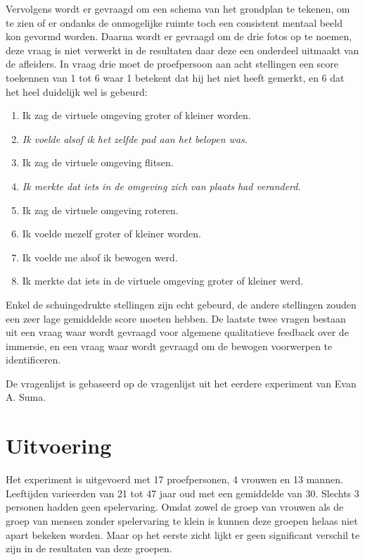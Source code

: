 Vervolgens wordt er gevraagd om een schema van het grondplan te tekenen, om te
zien of er ondanks de onmogelijke ruimte toch een consistent mentaal beeld kon
gevormd worden. Daarna wordt er gevraagd om de drie fotos op te noemen, deze
vraag is niet verwerkt in de resultaten daar deze een onderdeel uitmaakt van de
afleiders. In vraag drie moet de proefpersoon aan acht stellingen een score 
toekennen van 1 tot 6 waar 1 betekent dat hij het niet heeft gemerkt, en 6 dat 
het heel duidelijk wel is gebeurd:

\begin{enumerate}
  \item Ik zag de virtuele omgeving groter of kleiner worden.
  \item \emph{Ik voelde alsof ik het zelfde pad aan het belopen was.}
  \item Ik zag de virtuele omgeving flitsen.
  \item \emph{Ik merkte dat iets in de omgeving zich van plaats had veranderd.}
  \item Ik zag de virtuele omgeving roteren.
  \item Ik voelde mezelf groter of kleiner worden.
  \item Ik voelde me alsof ik bewogen werd.
  \item Ik merkte dat iets in de virtuele omgeving groter of kleiner werd.
\end{enumerate}

Enkel de schuingedrukte stellingen zijn echt gebeurd, de andere stellingen zouden
een zeer lage gemiddelde score moeten hebben. De laatste twee vragen bestaan uit 
een vraag waar wordt gevraagd voor algemene qualitatieve feedback over de 
immersie, en een vraag waar wordt gevraagd om de bewogen voorwerpen te 
identificeren.

De vragenlijst is gebaseerd op de vragenlijst uit het eerdere experiment van Evan
A. Suma\cite{suma11}.


\section{Uitvoering}
Het experiment is uitgevoerd met 17 proefpersonen, 4 vrouwen en 13 mannen.
Leeftijden varieerden van 21 tot 47 jaar oud met een gemiddelde van 30. Slechts
3 personen hadden geen spelervaring. Omdat zowel de groep van vrouwen als de
groep van mensen zonder spelervaring te klein is kunnen deze groepen helaas
niet apart bekeken worden. Maar op het eerste zicht lijkt er geen significant
verschil te zijn in de resultaten van deze groepen.



